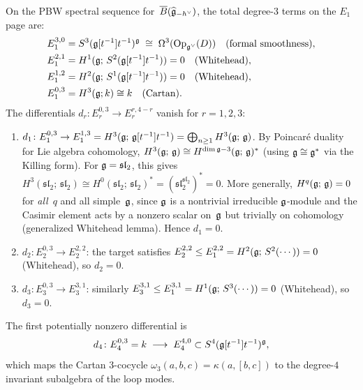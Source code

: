 \begin{proposition}
\label{prop:h3-differential-analysis}
On the PBW spectral sequence for~$\overline{B}(\widehat{\mathfrak{g}}_{-h^\vee})$,
the total degree-$3$ terms on the $E_1$ page are:
\begin{align*}
E_1^{3,0} &= S^3(\mathfrak{g}[t^{-1}]t^{-1})^{\mathfrak{g}}
  \;\cong\; \Omega^3(\mathrm{Op}_{\mathfrak{g}^\vee}(D))
  \quad\text{(formal smoothness)}, \\
E_1^{2,1} &= H^1(\mathfrak{g};\, S^2(\mathfrak{g}[t^{-1}]t^{-1})) = 0
  \quad\text{(Whitehead)}, \\
E_1^{1,2} &= H^2(\mathfrak{g};\, S^1(\mathfrak{g}[t^{-1}]t^{-1})) = 0
  \quad\text{(Whitehead)}, \\
E_1^{0,3} &= H^3(\mathfrak{g}; k) \cong k
  \quad\text{(Cartan)}.
\end{align*}
The differentials $d_r\colon E_r^{0,3} \to E_r^{r, 4-r}$
vanish for $r = 1, 2, 3$:
\begin{enumerate}[label=\textup{(\roman*)}]
\item $d_1\colon E_1^{0,3} \to E_1^{1,3}
  = H^3(\mathfrak{g};\, \mathfrak{g}[t^{-1}]t^{-1})
  = \bigoplus_{n \geq 1} H^3(\mathfrak{g};\, \mathfrak{g})$.
  By Poincar\'e duality for Lie algebra cohomology,
  $H^3(\mathfrak{g};\, \mathfrak{g}) \cong H^{\dim\mathfrak{g} - 3}(\mathfrak{g};\, \mathfrak{g})^*$
  \textup{(}using $\mathfrak{g} \cong \mathfrak{g}^*$ via the Killing form\textup{)}.
  For $\mathfrak{g} = \mathfrak{sl}_2$, this gives
  $H^3(\mathfrak{sl}_2;\, \mathfrak{sl}_2) \cong H^0(\mathfrak{sl}_2;\, \mathfrak{sl}_2)^*
  = (\mathfrak{sl}_2^{\mathfrak{sl}_2})^* = 0$.
  More generally, $H^q(\mathfrak{g};\, \mathfrak{g}) = 0$ for \emph{all}~$q$
  and all simple~$\mathfrak{g}$, since $\mathfrak{g}$ is a nontrivial irreducible
  $\mathfrak{g}$-module and the Casimir element acts by a nonzero scalar
  on~$\mathfrak{g}$ but trivially on cohomology
  \textup{(}generalized Whitehead lemma\textup{)}.
  Hence $d_1 = 0$.
\item $d_2\colon E_2^{0,3} \to E_2^{2,2}$: the target satisfies
  $E_2^{2,2} \leq E_1^{2,2} = H^2(\mathfrak{g};\, S^2(\cdots)) = 0$
  \textup{(}Whitehead\textup{)}, so $d_2 = 0$.
\item $d_3\colon E_3^{0,3} \to E_3^{3,1}$: similarly
  $E_3^{3,1} \leq E_1^{3,1} = H^1(\mathfrak{g};\, S^3(\cdots)) = 0$
  \textup{(}Whitehead\textup{)}, so $d_3 = 0$.
\end{enumerate}
The first potentially nonzero differential is
\begin{equation}\label{eq:d4-obstruction}
d_4\colon E_4^{0,3} = k
\;\longrightarrow\;
E_4^{4,0} \subset S^4(\mathfrak{g}[t^{-1}]t^{-1})^{\mathfrak{g}},
\end{equation}
which maps the Cartan $3$-cocycle
$\omega_3(a,b,c) = \kappa(a,[b,c])$ to the degree-$4$ invariant
subalgebra of the loop modes.
\end{proposition}

